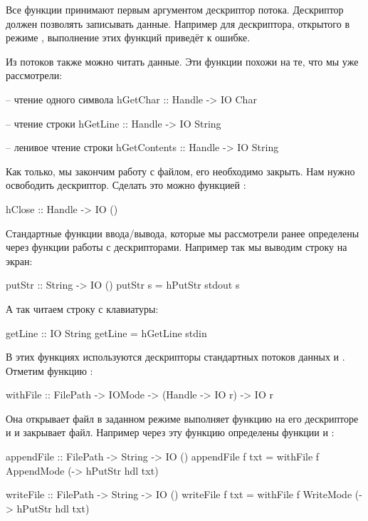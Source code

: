 Все функции принимают первым аргументом дескриптор потока. 
Дескриптор должен позволять записывать данные. Например
для дескриптора, открытого в режиме , выполнение
этих функций приведёт к ошибке.

Из потоков также можно читать данные. Эти функции похожи 
на те, что мы уже рассмотрели:

\begin{code}
-- чтение одного символа
hGetChar :: Handle -> IO Char

-- чтение строки
hGetLine :: Handle -> IO String

-- ленивое чтение строки
hGetContents :: Handle -> IO String
\end{code}

Как только, мы закончим работу с файлом, его необходимо
закрыть. Нам нужно освободить дескриптор. Сделать это можно
функцией :

\begin{code}
hClose :: Handle -> IO ()
\end{code}

Стандартные функции ввода/вывода, которые мы рассмотрели ранее
определены через функции работы с дескрипторами. 
Например так мы выводим строку на экран:

\begin{code}
putStr          :: String -> IO ()
putStr s        =  hPutStr stdout s
\end{code}

А так читаем строку с клавиатуры:

\begin{code}
getLine         :: IO String
getLine         =  hGetLine stdin
\end{code}

В этих функциях используются дескрипторы стандартных потоков
данных  и . Отметим функцию :

\begin{code}
withFile :: FilePath -> IOMode -> (Handle -> IO r) -> IO r
\end{code}

Она открывает файл в заданном режиме выполняет функцию 
на его дескрипторе и и закрывает файл. Например через 
эту функцию определены функции  и :

\begin{code}
appendFile      :: FilePath -> String -> IO ()
appendFile f txt = withFile f AppendMode (\hdl -> hPutStr hdl txt)

writeFile :: FilePath -> String -> IO ()
writeFile f txt = withFile f WriteMode (\hdl -> hPutStr hdl txt)
\end{code}

